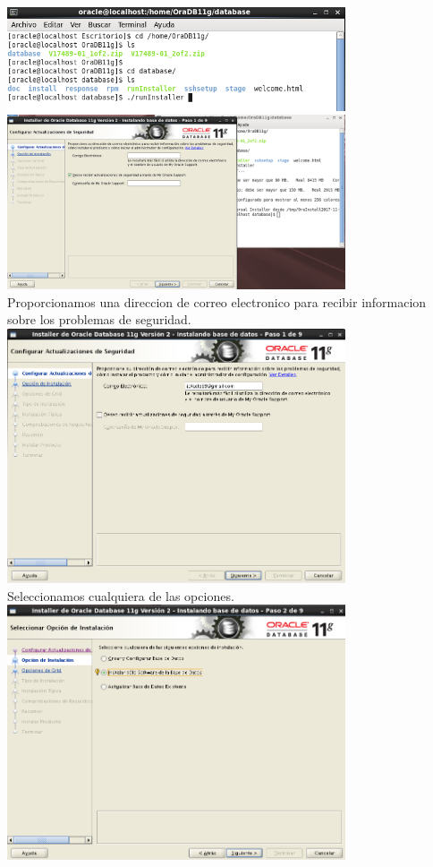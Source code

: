 \documentclass[12pt,letterpaper]{article}
\begin{document}
\begin{center}
\includegraphics[width=10cm]{./oraclelinux/10.png}
\includegraphics[width=10cm]{./oraclelinux/11.png}\\
Proporcionamos una direccion de correo electronico para recibir informacion sobre los problemas de seguridad.\\
\includegraphics[width=10cm]{./oraclelinux/12.png}\\
Seleccionamos cualquiera de las opciones.\\
\includegraphics[width=10cm]{./oraclelinux/13.png}\\

\end{center}
\end{document}
